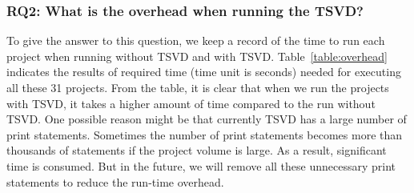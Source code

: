 \subsubsection{RQ2: What is the overhead when running the TSVD?}
To give the answer to this question, we keep a record of the time to run each project when
running without TSVD and with TSVD. Table~\ref{table:overhead} indicates the results of
required time (time unit is seconds)  needed for executing all these 31
projects. From the table, it is clear that when we run the projects with TSVD,
it takes a higher amount of time compared to the run without TSVD. One possible reason might be that
currently TSVD has a large number of print statements. Sometimes the number of print statements becomes
more than thousands of statements if the project volume is large. As a result,
significant time is consumed. But in the future, we will remove all these
unnecessary print statements to reduce the run-time overhead.



